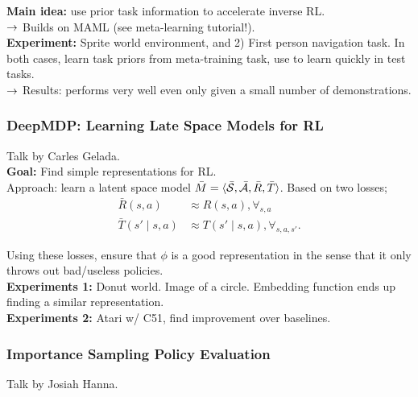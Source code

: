 {\bf Main idea:} use prior task information to accelerate inverse RL. \\

$\rightarrow$ Builds on MAML (see meta-learning tutorial!). \\

{\bf Experiment:} Sprite world environment, and 2) First person navigation task. In both cases, learn task priors from meta-training task, use to learn quickly in test tasks. \\

$\rightarrow$ Results: performs very well even only given a small number of demonstrations. \\

\spacerule

\subsubsection{DeepMDP: Learning Late Space Models for RL~\cite{gelada2019deepmdp}}

Talk by Carles Gelada. \\

{\bf Goal:} Find simple representations for RL. \\

Approach: learn a latent space model $\bar{M} = \langle \bar{\mathcal{S}}, \bar{\mathcal{A}}, \bar{R}, \bar{T} \rangle$. Based on two losses;
\begin{align}
    \bar{R}(s,a) &\approx R(s,a), \forall_{s,a} \\
    \bar{T}(s' \mid s,a) &\approx T(s' \mid s,a), \forall_{s,a,s'}.
\end{align}

Using these losses, ensure that $\phi$ is a good representation in the sense that it only throws out bad/useless policies. \\

{\bf Experiments 1:} Donut world. Image of a circle. Embedding function ends up finding a similar representation. \\

{\bf Experiments 2:} Atari w/ C51, find improvement over baselines.

\spacerule

\subsubsection{Importance Sampling Policy Evaluation~\cite{hanna2018importance}}

Talk by Josiah Hanna. \\

